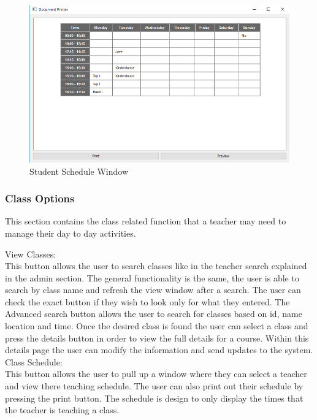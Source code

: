 \begin{figure}
  \includegraphics[width=\linewidth]{pics/userGuide/studentSchedule.png}
  \caption{Student Schedule Window}
  \label{fig:User doc: Student Schedule}
\end{figure}


\subsubsection{Class Options}
This section contains the class related function that a teacher may need to manage their day to day activities.

View Classes:\\
This button allows the user to search classes like in the teacher search explained in the admin section. The general functionality is the same, the user is able to search by class name and refresh the view window after a search. The user can check the exact button if they wish to look only for what they entered. The Advanced search button allows the user to search for classes based on id, name location and time. Once the desired class is found the user can select a class and press the details button in order to view the full details for a course. Within this details page the user can modify the information and send updates to the system.\\


Class Schedule:\\
This button allows the user to pull up a window where they can select a teacher and view there teaching schedule. The user can also print out their schedule by pressing the print button. The schedule is design to only display the times that the teacher is teaching a class.\\


